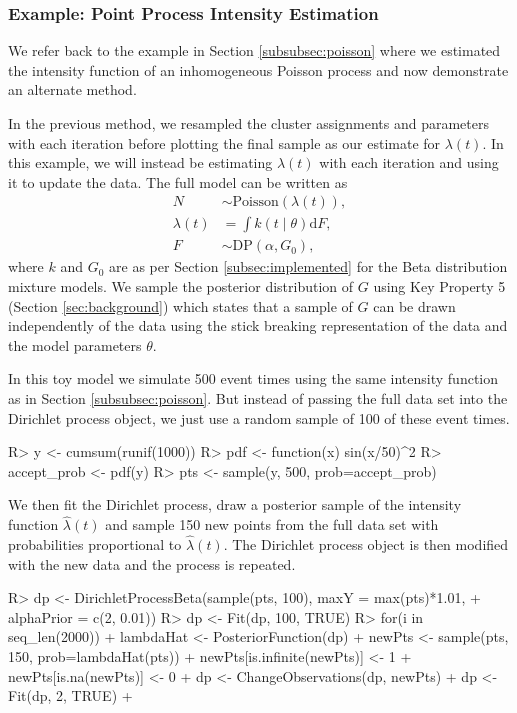 \documentclass[nojss]{jss}
\begin{document}
\subsubsection{Example: Point Process Intensity Estimation}
We refer back to the example in Section \ref{subsubsec:poisson} where we estimated the intensity function of an inhomogeneous Poisson process and now demonstrate an alternate method.

In the previous method, we resampled the cluster assignments and parameters with each iteration before plotting the final sample as our estimate for $\lambda (t)$. In this example, we will instead be estimating $\lambda (t)$ with each iteration and using it to update the data.  The full model can be written as
\begin{align*}
N & \sim \text{Poisson} ( \lambda (t) ), \\
\lambda (t) & = \int k(t \mid \theta) \mathrm{d}F, \\
F & \sim \text{DP} (\alpha , G_0),
\end{align*}
where $k$ and $G_0$ are as per Section \ref{subsec:implemented} for the Beta distribution mixture models. We sample the posterior distribution of $G$ using Key Property 5 (Section \ref{sec:background}) which states that a sample of $G$ can be drawn independently of the data using the stick breaking representation of the data and the model parameters $\theta$.

In this toy model we simulate 500 event times using the same intensity function as in Section \ref{subsubsec:poisson}. But instead of passing the full data set into the Dirichlet process object, we just use a random sample of 100 of these event times.

\begin{Schunk}
\begin{Sinput}
R> y <- cumsum(runif(1000))
R> pdf <- function(x) sin(x/50)^2
R> accept_prob <- pdf(y)
R> pts <- sample(y, 500, prob=accept_prob)
\end{Sinput}
\end{Schunk}

We then fit the Dirichlet process, draw a posterior sample of the intensity function $\hat{\lambda} (t)$ and sample 150 new points from the full data set with probabilities proportional to $\hat{\lambda} (t)$. The Dirichlet process object is then modified with the new data and the process is repeated.

\begin{Schunk}
\begin{Sinput}
R> dp <- DirichletProcessBeta(sample(pts, 100), maxY = max(pts)*1.01,
+  alphaPrior = c(2, 0.01))
R> dp <- Fit(dp, 100, TRUE)
R> for(i in seq_len(2000)){
+    lambdaHat <- PosteriorFunction(dp)
+    newPts <- sample(pts, 150, prob=lambdaHat(pts))
+    newPts[is.infinite(newPts)] <- 1
+    newPts[is.na(newPts)] <- 0
+    dp <- ChangeObservations(dp, newPts)
+    dp <- Fit(dp, 2, TRUE)
+  }
\end{Sinput}
\end{Schunk}
\end{document}
